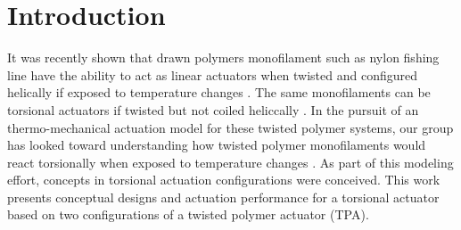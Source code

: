 \documentclass[twocolumn,10pt]{asme2e}
\begin{document}
\begin{abstract}
\end{abstract}

%
%
%
% 
%


\section{Introduction}
It was recently shown that drawn polymers monofilament such as nylon fishing line have the ability to act as linear actuators when twisted and configured helically if exposed to temperature changes \cite{haines_artificial}. The same monofilaments can be torsional actuators if twisted but not coiled heliccally \cite{haines_artificial}.  In the pursuit of an thermo-mechanical actuation model for these twisted polymer systems, our group has looked toward understanding how twisted polymer monofilaments would react torsionally when exposed to temperature changes \cite{shafer_first}. As part of this modeling effort, concepts in torsional actuation configurations were conceived. This work presents conceptual designs and actuation performance for a torsional actuator based on two configurations of a twisted polymer actuator (TPA). 
\end{document}
